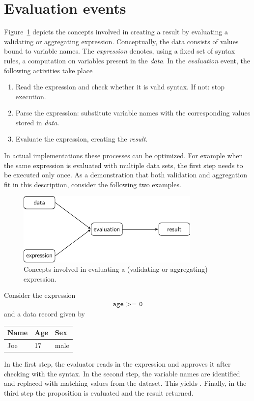 \section{Evaluation events}
\label{sect:evaluations}
Figure~\ref{fig:eval} depicts the concepts involved in creating a result by
evaluating a validating or aggregating expression. Conceptually, the \textsf{data}
consists of values bound to variable names. The \emph{expression} denotes, using
a fixed set of syntax rules, a computation on variables present in the \emph{data}.
In the \emph{evaluation} event, the following activities take place
\begin{enumerate}[noitemsep]
\item Read the expression and check whether it is valid syntax. If not: stop execution.
\item Parse the expression: substitute variable names with the corresponding values
stored in \emph{data}.
\item Evaluate the expression, creating the \emph{result}.
\end{enumerate}
In actual implementations these processes can be optimized. For example when
the same expression is evaluated with multiple data sets, the first step needs
to be executed only once. As a demonstration that both validation and
aggregation fit in this description, consider the following two examples.
%
\begin{figure}
\centering
\includegraphics[width=0.8\textwidth]{fig/eval.pdf}
\caption{Concepts involved in evaluating a (validating or aggregating) expression.}
\label{fig:eval}
\end{figure}

\begin{example}
Consider the expression
\begin{align*}
\texttt{age >= 0}
\end{align*}
and a data record given by
\begin{center}
\begin{tabular}{lll}
Name & Age & Sex \\
\hline
Joe  & 17  & male
\end{tabular}
\end{center}
In the first step, the evaluator reads in the expression and approves it after
checking with the syntax. In the second step, the variable names are identified
and replaced with matching values from the dataset. This yields .
Finally, in the third step the proposition  is evaluated and the
result returned.
\end{example}

